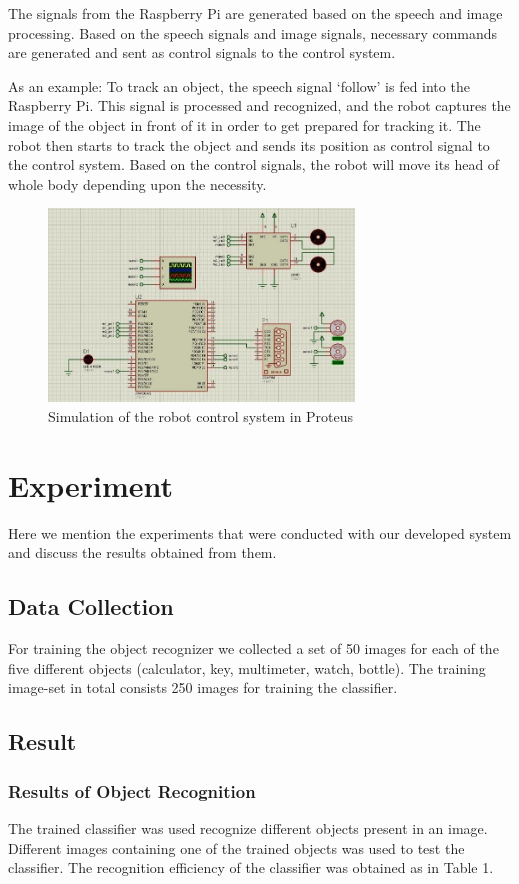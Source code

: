 \documentclass[journal,twoside]{IEEEtran}
\begin{document}
The signals from the Raspberry Pi are generated based on
the speech and image processing. Based on the speech signals
and image signals, necessary commands are generated and
sent as control signals to the control system.

As an example: To track an object, the speech signal
‘follow’ is fed into the Raspberry Pi. This signal is processed
and recognized, and the robot captures the image of the object
in front of it in order to get prepared for tracking it. The robot
then starts to track the object and sends its position as control
signal to the control system. Based on the control signals, the
robot will move its head of whole body depending upon the
necessity.

\begin{figure}[htbp]
\centering
\includegraphics[width=3.2in]{figure9}
\caption{Simulation of the robot control system in Proteus}
\label{fig:figure9}
\end{figure}

\section{Experiment}
Here we mention the experiments that were conducted with
our developed system and discuss the results obtained from
them.

\subsection{Data Collection}
For training the object recognizer we collected a set of 50
images for each of the five different objects (calculator, key,
multimeter, watch, bottle). The training image-set in total
consists 250 images for training the classifier.

\subsection{Result}

\subsubsection{ Results of Object Recognition}
The trained classifier was used recognize different objects
present in an image. Different images containing one of the
trained objects was used to test the classifier. The recognition
efficiency of the classifier was obtained as in Table 1.
\end{document}
